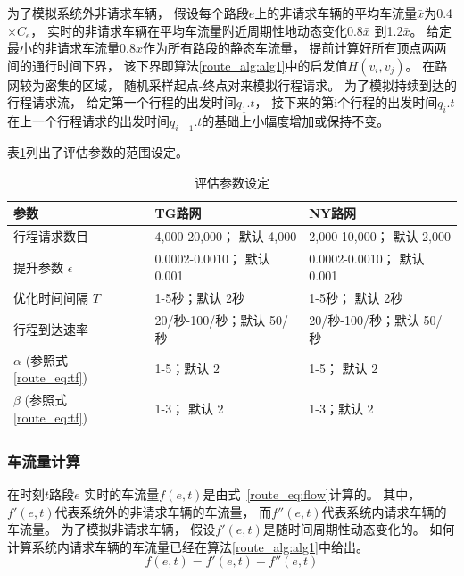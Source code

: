  为了模拟系统外非请求车辆， 假设每个路段$e$上的非请求车辆的平均车流量$\bar{x}$为0.4$\times C_e$， 实时的非请求车辆在平均车流量附近周期性地动态变化0.8$\bar{x}$ 到1.2$\bar{x}$。
给定最小的非请求车流量0.8$\bar{x}$作为所有路段的静态车流量， 提前计算好所有顶点两两间的通行时间下界， 该下界即算法\ref{route_alg:alg1}中的启发值$H(v_i,v_j)$。 在路网较为密集的区域， 随机采样起点-终点对来模拟行程请求。 为了模拟持续到达的行程请求流， 给定第一个行程的出发时间$q_1.t$， 接下来的第i个行程的出发时间$q_i.t$在上一个行程请求的出发时间$q_{i-1}.t$的基础上小幅度增加或保持不变。

表\ref{route_tb:para}列出了评估参数的范围设定。

\begin{table}[!ht]
    \caption{评估参数设定}\label{route_tb:para}
    \begin{tabular}{lll}
        \toprule
        \textbf{参数} & \textbf{TG路网} & \textbf{NY路网}\\
        \midrule
        行程请求数目 & 4,000-20,000； 默认 4,000 &  2,000-10,000； 默认 2,000 \\
        提升参数 $ \epsilon $ &
        0.0002-0.0010； 默认 0.001&  0.0002-0.0010； 默认 0.001 \\
        优化时间间隔 $T$ &
        1-5秒；默认 2秒&  1-5秒； 默认 2秒 \\
        行程到达速率 &
        20/秒-100/秒；默认 50/秒&  20/秒-100/秒；默认 50/秒 \\
        $ \alpha$ (参照式 \ref{route_eq:tf}) &  1-5；默认 2 &  1-5； 默认 2\\
        $\beta$ (参照式 \ref{route_eq:tf}) &  1-3； 默认 2&  1-3；默认 2 \\
        \bottomrule
    \end{tabular}
\end{table}

\subsubsection*{车流量计算}
在时刻$t$路段$e$ 实时的车流量$f(e,t)$是由式~\eqref{route_eq:flow}计算的。 其中，$f{'}(e,t)$代表系统外的非请求车辆的车流量， 而$f{''}(e, t) $代表系统内请求车辆的车流量。 为了模拟非请求车辆， 假设$f{'}(e,t)$是随时间周期性动态变化的。 如何计算系统内请求车辆的车流量已经在算法\ref{route_alg:alg1}中给出。
\begin{equation}\label{route_eq:flow}
f(e,t) = f{'}(e,t)+f{''}(e,t)
\end{equation}








